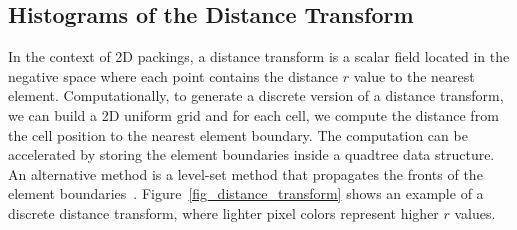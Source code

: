\subsection{Histograms of the Distance Transform}




\nnewtext
{
In the context of 2D packings, a distance transform is a scalar field located in the negative space where each point
contains the distance $r$ value to the nearest element.
Computationally, to generate a discrete version of a distance transform, 
we can build a 2D uniform grid and for each cell, we compute the distance from the cell position to the nearest element boundary.
The computation can be accelerated by storing the element boundaries inside a quadtree data structure.
An alternative method is a level-set method that propagates the fronts of the element boundaries~\cite{Osher1988}.
Figure~\ref{fig_distance_transform} shows an example of a discrete distance transform,
where lighter pixel colors represent higher $r$ values.
}

